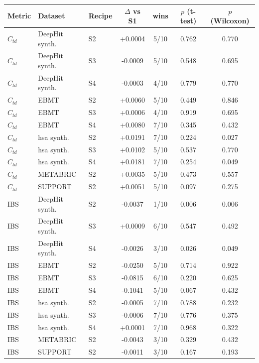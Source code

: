 \begin{tabular}{lllcccc}
\toprule
Metric & Dataset & Recipe & $\Delta$ vs S1 & wins & $p$ (t-test) & $p$ (Wilcoxon) \\
\midrule
$C_{td}$ & DeepHit synth. & S2 & +0.0004 & 5/10 & 0.762 & 0.770 \\
$C_{td}$ & DeepHit synth. & S3 & -0.0009 & 5/10 & 0.548 & 0.695 \\
$C_{td}$ & DeepHit synth. & S4 & -0.0003 & 4/10 & 0.779 & 0.770 \\
$C_{td}$ & EBMT & S2 & +0.0060 & 5/10 & 0.449 & 0.846 \\
$C_{td}$ & EBMT & S3 & +0.0006 & 4/10 & 0.919 & 0.695 \\
$C_{td}$ & EBMT & S4 & +0.0080 & 7/10 & 0.345 & 0.432 \\
$C_{td}$ & hsa synth. & S2 & +0.0191 & 7/10 & 0.224 & 0.027 \\
$C_{td}$ & hsa synth. & S3 & +0.0102 & 5/10 & 0.537 & 0.770 \\
$C_{td}$ & hsa synth. & S4 & +0.0181 & 7/10 & 0.254 & 0.049 \\
$C_{td}$ & METABRIC & S2 & +0.0035 & 5/10 & 0.473 & 0.557 \\
$C_{td}$ & SUPPORT & S2 & +0.0051 & 5/10 & 0.097 & 0.275 \\
IBS & DeepHit synth. & S2 & -0.0037 & 1/10 & 0.006 & 0.006 \\
IBS & DeepHit synth. & S3 & +0.0009 & 6/10 & 0.547 & 0.492 \\
IBS & DeepHit synth. & S4 & -0.0026 & 3/10 & 0.026 & 0.049 \\
IBS & EBMT & S2 & -0.0250 & 5/10 & 0.714 & 0.922 \\
IBS & EBMT & S3 & -0.0815 & 6/10 & 0.220 & 0.625 \\
IBS & EBMT & S4 & -0.1041 & 5/10 & 0.067 & 0.432 \\
IBS & hsa synth. & S2 & -0.0005 & 7/10 & 0.788 & 0.232 \\
IBS & hsa synth. & S3 & -0.0006 & 7/10 & 0.776 & 0.375 \\
IBS & hsa synth. & S4 & +0.0001 & 7/10 & 0.968 & 0.322 \\
IBS & METABRIC & S2 & -0.0043 & 3/10 & 0.329 & 0.432 \\
IBS & SUPPORT & S2 & -0.0011 & 3/10 & 0.167 & 0.193 \\
\bottomrule
\end{tabular}
